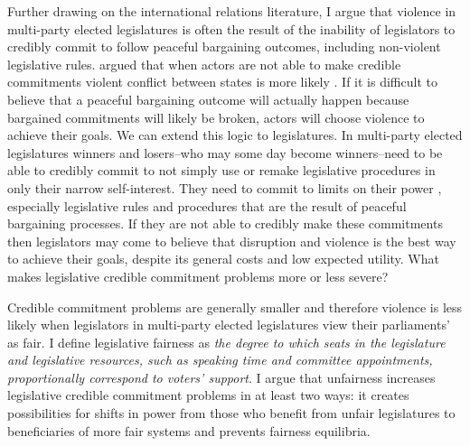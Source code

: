 \documentclass[a4paper]{article}\usepackage[]{graphicx}\usepackage[]{color}
\begin{document}
Further drawing on the international relations literature, I argue that violence in multi-party elected legislatures is often the result of the inability of legislators to credibly commit to follow peaceful bargaining outcomes, including non-violent legislative rules. \cite{Fearon1995} argued that when actors are not able to make credible commitments violent conflict between states is more likely \cite[see also][]{Powell2006}. If it is difficult to believe that a peaceful bargaining outcome will actually happen because bargained commitments will likely be broken, actors will choose violence to achieve their goals. We can extend this logic to legislatures. In multi-party elected legislatures winners and losers--who may some day become winners--need to be able to credibly commit to not simply use or remake legislative procedures in only their narrow self-interest. They need to commit to limits on their power \citep{riker1982,Gaubatz1996}, especially legislative rules and procedures that are the result of peaceful bargaining processes. If they are not able to credibly make these commitments then legislators may come to believe that disruption and violence is the best way to achieve their goals, despite its general costs and low expected utility. What makes legislative credible commitment problems more or less severe? 

Credible commitment problems are generally smaller and therefore violence is less likely when legislators in multi-party elected legislatures view their parliaments' as fair. I define legislative fairness as \emph{the degree to which seats in the legislature and legislative resources, such as speaking time and committee appointments, proportionally correspond to voters' support}. I argue that unfairness increases legislative credible commitment problems in at least two ways: it creates possibilities for shifts in power from those who benefit from unfair legislatures to beneficiaries of more fair systems and prevents fairness equilibria.
\end{document}
